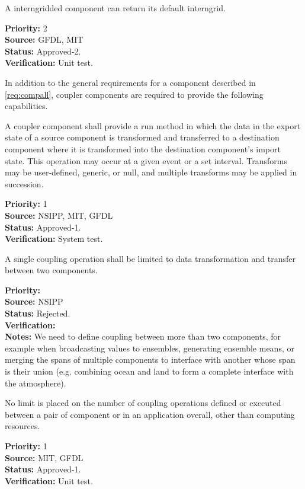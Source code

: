 A interngridded component can return its default interngrid.
\begin{reqlist}
{\bf Priority:} 2\\
{\bf Source:} GFDL, MIT\\
{\bf Status:} Approved-2.\\
{\bf Verification:} Unit test.
\end{reqlist}


In addition to the general requirements for a component described in 
\ref{req:compall}, coupler components are required to provide the
following capabilities.

A coupler component shall provide a run method in which the data in the
export state of a source component is transformed and 
transferred to a destination component where it is transformed 
into the destination component's import state.  This operation 
may occur at a given event or a set interval.  Transforms may be 
user-defined, generic, or null, and multiple transforms may be applied 
in succession.
\begin{reqlist}
{\bf Priority:} 1\\ 
{\bf Source:} NSIPP, MIT, GFDL \\
{\bf Status:} Approved-1.\\
{\bf Verification:} System test.
\end{reqlist}

A single coupling operation shall be limited to data transformation and
transfer between two components.
\begin{reqlist}
{\bf Priority:} \\ 
{\bf Source:} NSIPP \\
{\bf Status:} Rejected.\\
{\bf Verification:} \\
{\bf Notes:} We need to define coupling between more than two 
components, for example when broadcasting values to ensembles,
generating ensemble means, or merging the spans of multiple components
to interface with another whose span is their union (e.g. 
combining ocean and land to form a complete interface with the 
atmosphere).
\end{reqlist}

No limit is placed on the number of coupling operations defined or
executed between a pair of component or in an application overall, 
other than computing resources.
\begin{reqlist}
{\bf Priority:} 1\\ 
{\bf Source:} MIT, GFDL \\
{\bf Status:} Approved-1.\\
{\bf Verification:} Unit test.\\
\end{reqlist}

